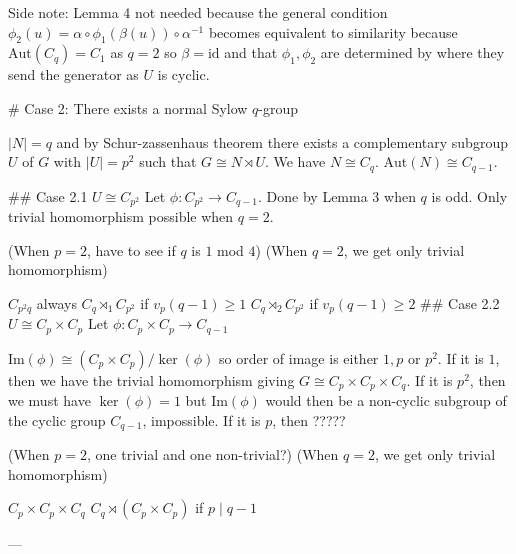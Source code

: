 Side note: Lemma 4 not needed because the general condition $\phi_2(u) = \alpha \circ \phi_1(\beta(u)) \circ \alpha^{-1}$ becomes equivalent to similarity because $\text{Aut}(C_q) = C_1$ as $q = 2$ so $\beta = \text{id}$ and that $\phi_1, \phi_2$ are determined by where they send the generator as $U$ is cyclic.

# Case 2: There exists a normal Sylow $q$-group

$|N| = q$ and by Schur-zassenhaus theorem there exists a complementary subgroup $U$ of $G$ with $|U| = p^2$ such that $G \cong N \rtimes U$. We have $N \cong C_q$. $\text{Aut}(N) \cong C_{q-1}$.

## Case 2.1 $U \cong C_{p^2}$
Let $\phi : C_{p^2} \rightarrow C_{q-1}$. Done by Lemma 3 when $q$ is odd. Only trivial homomorphism possible when $q = 2$.

(When $p = 2$, have to see if $q$ is $1$ mod $4$)
(When $q = 2$, we get only trivial homomorphism)

$C_{p^2q}$ always
$C_q \rtimes_1 C_{p^2}$ if $v_p(q - 1) \geq 1$
$C_q \rtimes_2 C_{p^2}$ if $v_p(q - 1) \geq 2$
## Case 2.2 $U \cong C_p \times C_p$
Let $\phi : C_p \times C_p \rightarrow C_{q-1}$

$\text{Im}(\phi) \cong (C_p \times C_p) / \ker(\phi)$ so order of image is either $1, p$ or $p^2$. If it is $1$, then we have the trivial homomorphism giving $G \cong C_p \times C_p \times C_{q}$. If it is $p^2$, then we must have $\ker(\phi) = 1$ but $\text{Im}(\phi)$ would then be a non-cyclic subgroup of the cyclic group $C_{q-1}$, impossible. If it is $p$, then ?????

(When $p = 2$, one trivial and one non-trivial?)
(When $q = 2$, we get only trivial homomorphism)

$C_p \times C_p \times C_q$
$C_q \rtimes (C_p \times C_p)$ if $p \mid q - 1$

---

